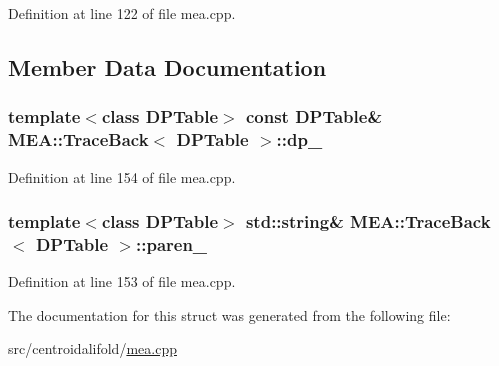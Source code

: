 Definition at line 122 of file mea.\+cpp.



\subsection{Member Data Documentation}
\hypertarget{struct_m_e_a_1_1_trace_back_a0bdabdc1f5a2a42895b8d0ca92163c95}{
\subsubsection[{dp\+\_\+}]{\setlength{\rightskip}{0pt plus 5cm}template$<$class D\+P\+Table$>$ const D\+P\+Table\& {\bf M\+E\+A\+::\+Trace\+Back}$<$ D\+P\+Table $>$\+::dp\+\_\+}}\label{struct_m_e_a_1_1_trace_back_a0bdabdc1f5a2a42895b8d0ca92163c95}


Definition at line 154 of file mea.\+cpp.

\hypertarget{struct_m_e_a_1_1_trace_back_a86a5e7ad5ef04abaaa689c174ae3dc07}{
\subsubsection[{paren\+\_\+}]{\setlength{\rightskip}{0pt plus 5cm}template$<$class D\+P\+Table$>$ std\+::string\& {\bf M\+E\+A\+::\+Trace\+Back}$<$ D\+P\+Table $>$\+::paren\+\_\+}}\label{struct_m_e_a_1_1_trace_back_a86a5e7ad5ef04abaaa689c174ae3dc07}


Definition at line 153 of file mea.\+cpp.



The documentation for this struct was generated from the following file\+:\begin{DoxyCompactItemize}
\item 
src/centroidalifold/\hyperlink{mea_8cpp}{mea.\+cpp}\end{DoxyCompactItemize}
